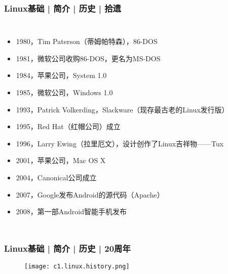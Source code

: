 \begin{frame}
  \frametitle{Linux基础 | 简介 | 历史 | 拾遗}
  \begin{columns}
  \begin{itemize}[<+->]
    \item 1980，Tim Paterson（蒂姆\textbullet 帕特森），86-DOS
    \item 1981，微软公司收购86-DOS，更名为MS-DOS
    \item 1984，苹果公司，System 1.0
    \item 1985，微软公司，Windows 1.0
    \item 1993，Patrick Volkerding，Slackware（现存最古老的Linux发行版）
    \item 1995，Red Hat（红帽公司）成立
    \item 1996，Larry Ewing（拉里\textbullet 厄文），设计创作了Linux吉祥物——\alert{Tux}
    \item 2001，苹果公司，Mac OS X
    \item 2004，Canonical公司成立
    \item 2007，Google发布Android的源代码（Apache）
    \item 2008，第一部Android智能手机发布
  \end{itemize}
  \end{columns}
\end{frame}

\begin{frame}
  \frametitle{Linux基础 | 简介 | 历史 | 20周年}
  \begin{figure}
    \centering
    \texttt{[image: c1.linux.history.png]}
  \end{figure}
\end{frame}

